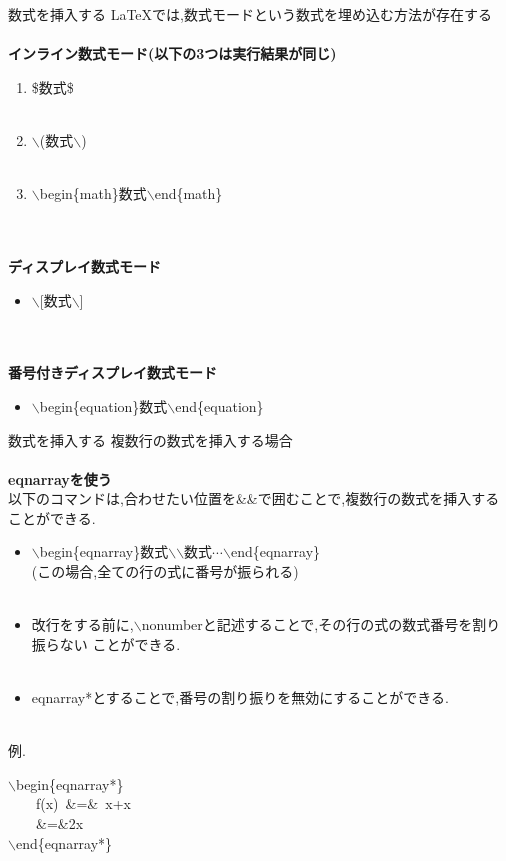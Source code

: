 \documentclass[dvipdfmx]{beamer}
\newcommand{\tbs}{$\backslash$}
\begin{document}
  \begin{frame}{数式を挿入する}
    \LaTeX では,数式モードという数式を埋め込む方法が存在する\\~\\
    \scriptsize
   {\normalsize\bf インライン数式モード(以下の3つは実行結果が同じ)}
    \begin{enumerate}
      \item \$数式\$\\~\\
      \item \tbs (数式\tbs )\\~\\
      \item \tbs begin\{math\}数式\tbs end\{math\}\\~\\~\\
    \end{enumerate}
    {\normalsize\bf ディスプレイ数式モード}
    \begin{itemize}
      \item \tbs[数式\tbs]\\~\\~\\
    \end{itemize}
    {\normalsize\bf 番号付きディスプレイ数式モード}
      \begin{itemize}
        \item \tbs begin\{equation\}数式\tbs end\{equation\}
      \end{itemize}
  \end{frame}
  \begin{frame}{数式を挿入する}
    複数行の数式を挿入する場合\\~\\
    \scriptsize
    {\normalsize\bf eqnarrayを使う}\\
    {\tiny 以下のコマンドは,合わせたい位置を\&\&で囲むことで,複数行の数式を挿入することができる.}
    \begin{itemize}
      \item \tbs begin\{eqnarray\}数式\tbs\tbs 数式$\cdots$\tbs end\{eqnarray\}\\
            (この場合,全ての行の式に番号が振られる)\\~\\
      \item 改行をする前に,\tbs nonumberと記述することで,その行の式の数式番号を割り振らない
            ことができる.\\~\\
      \item eqnarray*とすることで,番号の割り振りを無効にすることができる.\\~\\
    \end{itemize}
    例.\\
    \begin{center}
      \tbs begin\{eqnarray*\}\\
      ~~~~f(x)~\&=\&~x+x\\
      ~~~~\&=\&2x\\
      \tbs end\{eqnarray*\}
    \end{center}
  \end{frame}
\end{document}
